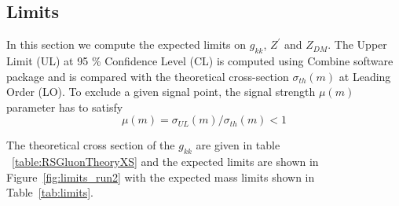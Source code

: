 \subsection{Limits}


In this section we compute the expected limits on $g_{kk}$, $ Z^{'}$ and $Z_{DM}$. The Upper Limit (UL) at 95 \% Confidence Level (CL) is computed using Combine software package and is compared with the theoretical cross-section $\sigma_{th}(m)$ at Leading Order (LO).  To exclude a given signal point, the signal strength $\mu(m)$ parameter has to satisfy  
\begin{equation}
\mu(m) = \sigma_{UL}(m) / \sigma_{th}(m) < 1
\end{equation}
    


The theoretical cross section of the $g_{kk}$ are given in table ~\ref{table:RSGluonTheoryXS} and the expected limits are shown in Figure~\ref{fig:limits_run2} with the expected mass limits shown in Table~\ref{tab:limits}.
%	
%		
%		
%	

\newcommand{\ColTitle}[1]{\multicolumn{2}{|P{4cm}|}{\bf #1}} %
\newcommand{\ColMass}{\multicolumn{1}{|P{2cm}|}{\bf Mass $(TeV)$}}
\newcommand{\ColXS}{\multicolumn{1}{|P{2cm}|}{\bf$\sigma\ (pb)$}}


